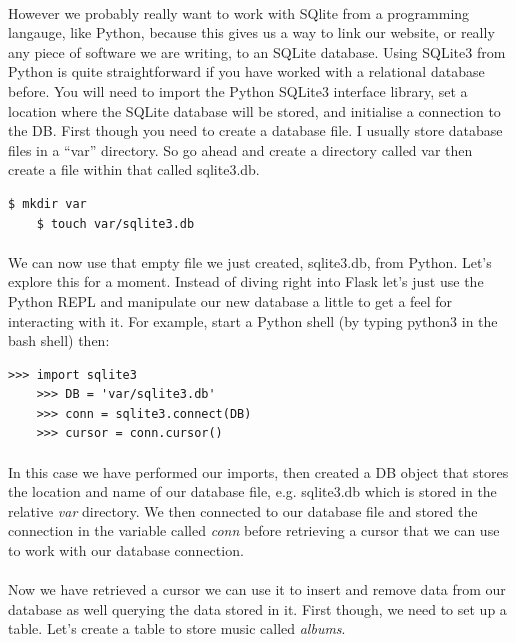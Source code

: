 \documentclass[12pt, a4paper, oneside]{book}
\begin{document}
{\paragraph{} However we probably really want to work with SQlite from a programming langauge, like Python, because this gives us a way to link our website, or really any piece of software we are writing, to an SQLite database. Using SQLite3 from Python is quite straightforward if you have worked with a relational database before. You will need to import the Python SQLite3 interface library, set a location where the SQLite database will be stored, and initialise a connection to the DB. First though you need to create a database file. I usually store database files in a ``var'' directory. So go ahead and create a directory called var then create a file within that called sqlite3.db.

\begin{lstlisting}[style=DOS]
    $ mkdir var
    $ touch var/sqlite3.db
\end{lstlisting}


\paragraph{} We can now use that empty file we just created, sqlite3.db, from Python. Let's explore this for a moment. Instead of diving right into Flask let's just use the Python REPL and manipulate our new database a little to get a feel for interacting with it.  For example, start a Python shell (by typing python3 in the bash shell) then:

\begin{lstlisting}[style=DOS]
    >>> import sqlite3
    >>> DB = 'var/sqlite3.db'
    >>> conn = sqlite3.connect(DB)
    >>> cursor = conn.cursor()
\end{lstlisting}

\paragraph{} In this case we have performed our imports, then created a DB object that stores the location and name of our database file, e.g. sqlite3.db which is stored in the relative \emph{var} directory. We then connected to our database file and stored the connection in the variable called \emph{conn} before retrieving a cursor that we can use to work with our database connection.

\paragraph{} Now we have retrieved a cursor we can use it to insert and remove data from our database as well querying the data stored in it. First though, we need to set up a table. Let's create a table to store music called \emph{albums}.

}
\end{document}
